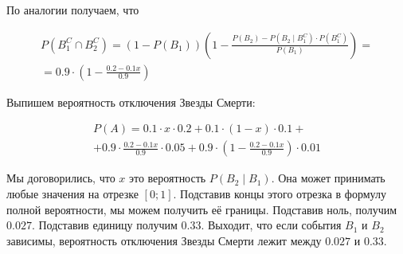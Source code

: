 \documentclass[12pt, a4paper, oneside]{extreport}
\theoremstyle{plain}              %
\theoremstyle{definition}         %
\newtheorem{problem}{\color{myblue} Упражнение}
\begin{document}
\begin{sol}
По аналогии получаем, что 

\begin{multline*}
P(B_1^C \cap B_2^C) = (1 - P(B_1))(1 - \frac{P(B_2) - P(B_2 \mid B_1^C) \cdot P(B_1^C)}{P(B_1)} ) = \\ =  0.9 \cdot (1 - \frac{0.2 - 0.1 x}{0.9})
\end{multline*}

Выпишем вероятность отключения Звезды Смерти: 
		
\begin{multline*}
P(A) = 0.1 \cdot x \cdot 0.2 + 0.1 \cdot (1-x) \cdot 0.1 + \\ + 0.9 \cdot \frac{0.2 - 0.1x}{0.9} \cdot 0.05 + 0.9 \cdot (1 - \frac{0.2 - 0.1x}{0.9}) \cdot 0.01
\end{multline*}
		
Мы договорились, что  $x$ это вероятность $P(B_2 \mid B_1)$. Она может принимать любые значения на отрезке $[0;1]$. Подставив концы этого отрезка в формулу полной вероятности, мы можем получить её границы. Подставив ноль, получим $0.027$. Подставив единицу получим $0.33$. Выходит, что если события $B_1$ и $B_2$ зависимы, вероятность отключения Звезды Смерти лежит между $0.027$ и $0.33$.
\end{sol}


%	
\end{document}
